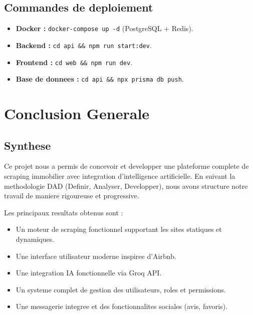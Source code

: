 \documentclass[12pt,a4paper]{report}
\begin{document}
\section{Commandes de deploiement}

\begin{itemize}
  \item \textbf{Docker :} \texttt{docker-compose up -d} (PostgreSQL + Redis).
  \item \textbf{Backend :} \texttt{cd api \&\& npm run start:dev}.
  \item \textbf{Frontend :} \texttt{cd web \&\& npm run dev}.
  \item \textbf{Base de donnees :} \texttt{cd api \&\& npx prisma db push}.
\end{itemize}

\chapter*{Conclusion Generale}

\vspace*{0.5cm}

\section*{Synthese}

Ce projet nous a permis de concevoir et developper une plateforme complete de scraping immobilier avec integration d'intelligence artificielle. En suivant la methodologie DAD (Definir, Analyser, Developper), nous avons structure notre travail de maniere rigoureuse et progressive.

Les principaux resultats obtenus sont :
\begin{itemize}
  \item Un moteur de scraping fonctionnel supportant les sites statiques et dynamiques.
  \item Une interface utilisateur moderne inspiree d'Airbnb.
  \item Une integration IA fonctionnelle via Groq API.
  \item Un systeme complet de gestion des utilisateurs, roles et permissions.
  \item Une messagerie integree et des fonctionnalites sociales (avis, favoris).
\end{itemize}
\end{document}
